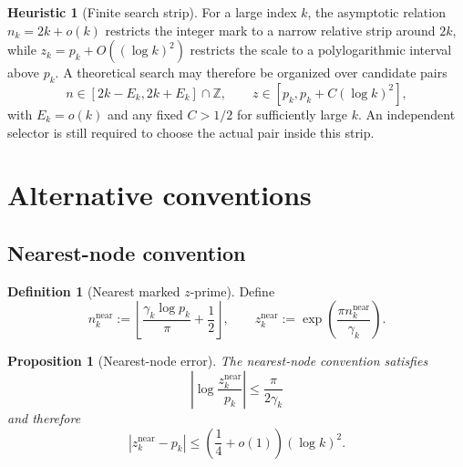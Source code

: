 \documentclass[11pt]{amsart}
\numberwithin{equation}{section}
\theoremstyle{plain}
\newtheorem{proposition}[theorem]{Proposition}
\theoremstyle{definition}
\newtheorem{definition}[theorem]{Definition}
\newtheorem{heuristic}[theorem]{Heuristic}
\theoremstyle{remark}
\begin{document}
\begin{heuristic}[Finite search strip]
\label{heur:finite_search_strip}
For a large index $k$, the asymptotic relation $n_k=2k+o(k)$ restricts the
integer mark to a narrow relative strip around $2k$, while
$z_k=p_k+O((\log k)^2)$ restricts the scale to a polylogarithmic interval
above $p_k$.  A theoretical search may therefore be organized over candidate
pairs
\begin{equation}
 n\in[2k-E_k,2k+E_k]\cap\mathbb Z,
 \qquad
 z\in[p_k,p_k+C(\log k)^2],
 \label{eq:finite_candidate_strip}
\end{equation}
with $E_k=o(k)$ and any fixed $C>1/2$ for sufficiently large $k$.  An
independent selector is still required to choose the actual pair inside this
strip.
\end{heuristic}

\section{Alternative conventions}
\label{sec:alternative_conventions}

\subsection{Nearest-node convention}
\label{subsec:nearest_node}

\begin{definition}[Nearest marked $z$-prime]
\label{def:nearest_marked_zprime}
Define
\begin{equation}
 n_k^{\mathrm{near}}
 :=\left\lfloor\frac{\gamma_k\log p_k}{\pi}+\frac12\right\rfloor,
 \qquad
 z_k^{\mathrm{near}}
 :=\exp\left(\frac{\pi n_k^{\mathrm{near}}}{\gamma_k}\right).
 \label{eq:nearest_definition}
\end{equation}
\end{definition}

\begin{proposition}[Nearest-node error]
\label{prop:nearest_node_error}
The nearest-node convention satisfies
\begin{equation}
 \left|\log\frac{z_k^{\mathrm{near}}}{p_k}\right|
 \leq\frac{\pi}{2\gamma_k}
 \label{eq:nearest_log_bound}
\end{equation}
and therefore
\begin{equation}
 |z_k^{\mathrm{near}}-p_k|
 \leq\left(\frac14+o(1)\right)(\log k)^2.
 \label{eq:nearest_additive_envelope}
\end{equation}
\end{proposition}
\end{document}
